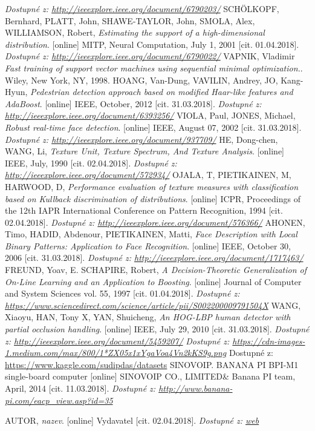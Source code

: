 \begin{thebibliography}{99}
 		\textit{Dostupné z: \url{http://ieeexplore.ieee.org/document/6790203/}}
 	 SCHÖLKOPF, Bernhard, PLATT, John, SHAWE-TAYLOR, John, SMOLA, Alex, WILLIAMSON, Robert, \textit{Estimating the support of a high-dimensional distribution}. [online] MITP, Neural Computation, July 1, 2001 [cit. 01.04.2018]. 
 		\textit{Dostupné z: \url{http://ieeexplore.ieee.org/document/6790022/}}
 	 VAPNIK, Vladimir \textit{Fast training of support vector machines using sequential minimal optimization.}. Wiley, New York, NY, 1998. 
 	 HOANG, Van-Dung, VAVILIN, Andrey, JO, Kang-Hyun, \textit{Pedestrian detection approach based on modified Haar-like features and AdaBoost}. [online] IEEE, October, 2012 [cit. 31.03.2018]. 
 		\textit{Dostupné z: \url{http://ieeexplore.ieee.org/document/6393256/}}
 	 VIOLA, Paul, JONES, Michael, \textit{Robust real-time face detection}. [online] IEEE, August 07, 2002 [cit. 31.03.2018]. 
 		\textit{Dostupné z: \url{http://ieeexplore.ieee.org/document/937709/}}
 	 HE, Dong-chen, WANG, Li, \textit{Texture Unit, Texture Spectrum, And Texture Analysis}. [online] IEEE, July, 1990 [cit. 02.04.2018]. 
 		\textit{Dostupné z: \url{http://ieeexplore.ieee.org/document/572934/}}
 	 OJALA, T, PIETIKAINEN, M, HARWOOD, D, \textit{Performance evaluation of texture measures with classification based on Kullback discrimination of distributions}. [online] ICPR, Proceedings of the 12th IAPR International Conference on Pattern Recognition, 1994 [cit. 02.04.2018]. 
 		\textit{Dostupné z: \url{http://ieeexplore.ieee.org/document/576366/}}
	 AHONEN, Timo, HADID, Abdenour, PIETIKAINEN, Matti, \textit{Face Description with Local Binary Patterns: Application to Face Recognition}. [online] IEEE, October 30, 2006 [cit. 31.03.2018]. 
 		\textit{Dostupné z: \url{http://ieeexplore.ieee.org/document/1717463/}}
 	 FREUND, Yoav, E. SCHAPIRE, Robert, \textit{A Decision-Theoretic Generalization of On-Line Learning and an Application to Boosting}. [online] Journal of Computer and System Sciences vol. 55, 1997 [cit. 01.04.2018]. 
 		\textit{Dostupné z: \url{https://www.sciencedirect.com/science/article/pii/S002200009791504X}}
 	 WANG, Xiaoyu, HAN, Tony X, YAN, Shuicheng, \textit{An HOG-LBP human detector with partial occlusion handling}. [online] IEEE, July 29, 2010 [cit. 31.03.2018]. 
 	\textit{Dostupné z: \url{http://ieeexplore.ieee.org/document/5459207/}}
	 \textit{Dostupné z: \url{https://cdn-images-1.medium.com/max/800/1*ZX05x1xYgaVoa4Vn2kKS9g.png}}
 	 Dostupné z: \url{https://www.kaggle.com/sudipdas/datasets}
	 SINOVOIP. BANANA PI BPI-M1 single-board computer [online] SINOVOIP CO., LIMITED\& Banana PI team, April, 2014  [cit. 11.03.2018]. 
		\textit{Dostupné z: \url{http://www.banana-pi.com/eacp_view.asp?id=35}}
 
 \bibitem{} AUTOR, \textit{nazev}. [online] Vydavatel [cit. 02.04.2018]. 
 	\textit{Dostupné z: \url{web}}
\end{thebibliography}
